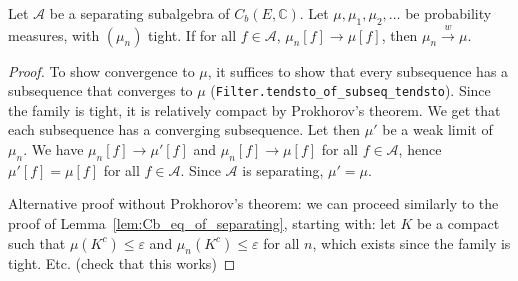 \begin{lemma}\label{lem:cvg_of_separating}
Let $\mathcal A$ be a separating subalgebra of $C_b(E, \mathbb{C})$. Let $\mu, \mu_1, \mu_2, \ldots$ be probability measures, with $(\mu_n)$ tight. If for all $f \in \mathcal A$, $\mu_n[f] \to \mu[f]$, then $\mu_n \xrightarrow{w} \mu$.
\end{lemma}

\begin{proof}
To show convergence to $\mu$, it suffices to show that every subsequence has a subsequence that converges to $\mu$ (\texttt{Filter.tendsto_of_subseq_tendsto}).
Since the family is tight, it is relatively compact by Prokhorov's theorem. We get that each subsequence has a converging subsequence.
Let then $\mu'$ be a weak limit of $\mu_n$. We have $\mu_n[f] \to \mu'[f]$ and $\mu_n[f] \to \mu[f]$ for all $f \in \mathcal A$, hence $\mu'[f] = \mu[f]$ for all $f \in \mathcal A$. Since $\mathcal A$ is separating, $\mathcal \mu' = \mu$.

Alternative proof without Prokhorov's theorem: we can proceed similarly to the proof of Lemma~\ref{lem:Cb_eq_of_separating}, starting with: let $K$ be a compact such that $\mu(K^c) \le \varepsilon$ and $\mu_n(K^c) \le \varepsilon$ for all $n$, which exists since the family is tight. Etc. (check that this works)
\end{proof}
